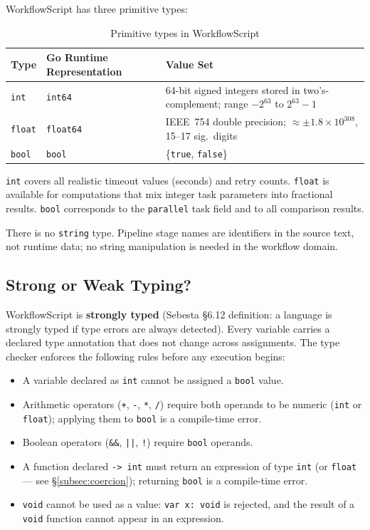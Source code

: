 \documentclass[10pt,a4paper]{article}
\begin{document}
WorkflowScript has three primitive types:

\begin{table}[h!]
\centering
\begin{tabular}{@{}lll@{}}
\toprule
\textbf{Type} & \textbf{Go Runtime Representation} & \textbf{Value Set} \\
\midrule
\texttt{int}   & \texttt{int64}   & 64-bit signed integers stored in two's-complement; range $-2^{63}$ to $2^{63}-1$ \\
\texttt{float} & \texttt{float64} & IEEE~754 double precision; $\approx \pm 1.8 \times 10^{308}$, 15--17 sig.\ digits \\
\texttt{bool}  & \texttt{bool}    & \{\texttt{true}, \texttt{false}\} \\
\bottomrule
\end{tabular}
\caption{Primitive types in WorkflowScript}
\end{table}

\texttt{int} covers all realistic timeout values (seconds) and retry counts. \texttt{float}
is available for computations that mix integer task parameters into fractional results.
\texttt{bool} corresponds to the \texttt{parallel} task field and to all comparison results.

There is no \texttt{string} type. Pipeline stage names are identifiers in the source text, not
runtime data; no string manipulation is needed in the workflow domain.

\subsection{Strong or Weak Typing?}

WorkflowScript is \textbf{strongly typed} (Sebesta \S6.12 definition: a language is strongly
typed if type errors are always detected). Every variable carries a declared type annotation
that does not change across assignments. The type checker enforces the following rules before
any execution begins:

\begin{itemize}
    \item A variable declared as \texttt{int} cannot be assigned a \texttt{bool} value.
    \item Arithmetic operators (\texttt{+}, \texttt{-}, \texttt{*}, \texttt{/}) require both
          operands to be numeric (\texttt{int} or \texttt{float}); applying them to
          \texttt{bool} is a compile-time error.
    \item Boolean operators (\texttt{\&\&}, \texttt{||}, \texttt{!}) require \texttt{bool}
          operands.
    \item A function declared \texttt{-> int} must return an expression of type \texttt{int}
          (or \texttt{float} --- see \S\ref{subsec:coercion}); returning \texttt{bool} is a
          compile-time error.
    \item \texttt{void} cannot be used as a value: \texttt{var x: void} is rejected, and the
          result of a \texttt{void} function cannot appear in an expression.
\end{itemize}
\end{document}
